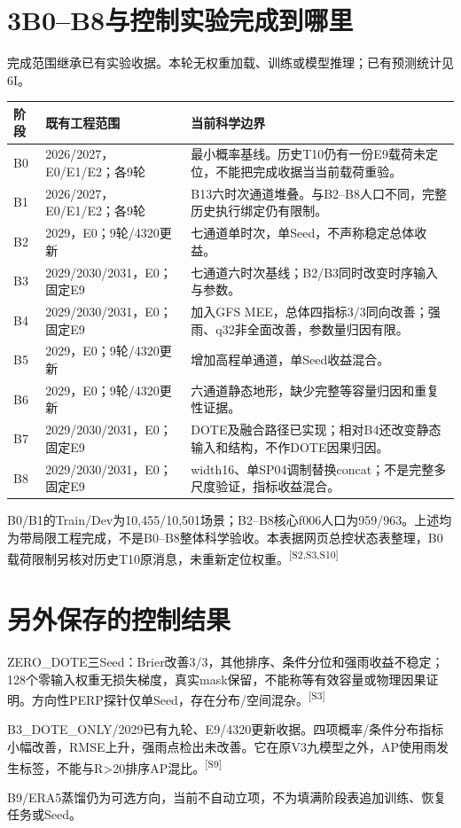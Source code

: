 \documentclass[UTF8,10.5pt,a4paper,fontset=none]{ctexart}
\newcommand{\evi}[1]{\textsuperscript{\color{muted}[#1]}}
\newcommand{\pageheading}[2]{\clearpage\section*{#1}\textcolor{muted}{#2}\par\vspace{3pt}}
\begin{document}
\pageheading{3\quad B0--B8与控制实验完成到哪里}{完成范围继承已有实验收据。本轮无权重加载、训练或模型推理；已有预测统计见6I。}
\begin{tabularx}{\textwidth}{@{}p{0.8cm}p{4.4cm}>{\raggedright\arraybackslash}X@{}}
\toprule 阶段 & 既有工程范围 & 当前科学边界\\\midrule
B0 & 2026/2027，E0/E1/E2；各9轮 & 最小概率基线。历史T10仍有一份E9载荷未定位，不能把完成收据当当前载荷重验。\\
B1 & 2026/2027，E0/E1/E2；各9轮 & B13六时次通道堆叠。与B2--B8人口不同，完整历史执行绑定仍有限制。\\
B2 & 2029，E0；9轮/4320更新 & 七通道单时次，单Seed，不声称稳定总体收益。\\
B3 & 2029/2030/2031，E0；固定E9 & 七通道六时次基线；B2/B3同时改变时序输入与参数。\\
B4 & 2029/2030/2031，E0；固定E9 & 加入GFS MEE，总体四指标3/3同向改善；强雨、q32非全面改善，参数量归因有限。\\
B5 & 2029，E0；9轮/4320更新 & 增加高程单通道，单Seed收益混合。\\
B6 & 2029，E0；9轮/4320更新 & 六通道静态地形，缺少完整等容量归因和重复性证据。\\
B7 & 2029/2030/2031，E0；固定E9 & DOTE及融合路径已实现；相对B4还改变静态输入和结构，不作DOTE因果归因。\\
B8 & 2029/2030/2031，E0；固定E9 & width16、单SP04调制替换concat；不是完整多尺度验证，指标收益混合。\\
\bottomrule
\end{tabularx}
\par
B0/B1的Train/Dev为10,455/10,501场景；B2--B8核心f006人口为959/963。上述均为带局限工程完成，不是B0--B8整体科学验收。本表据网页总控状态表整理，B0载荷限制另核对历史T10原消息，未重新定位权重。\evi{S2,S3,S10}
\section*{另外保存的控制结果}
ZERO\_DOTE三Seed：Brier改善3/3，其他排序、条件分位和强雨收益不稳定；128个零输入权重无损失梯度，真实mask保留，不能称等有效容量或物理因果证明。方向性PERP探针仅单Seed，存在分布/空间混杂。\evi{S3}

B3\_DOTE\_ONLY/2029已有九轮、E9/4320更新收据。四项概率/条件分布指标小幅改善，RMSE上升，强雨点检出未改善。它在原V3九模型之外，AP使用雨发生标签，不能与R>20排序AP混比。\evi{S9}

B9/ERA5蒸馏仍为可选方向，当前不自动立项，不为填满阶段表追加训练、恢复任务或Seed。
\end{document}
